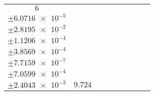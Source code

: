 \documentclass[8pt]{article}
\begin{document}
\begin{longtable}[l]{c c c c c c c c c}
$\num{6}$ & \begin{tabular}[c]{@{}c@{}}$\num{0.12366}$ \\ $\pm\num{6.0716e-5}$\end{tabular} & \begin{tabular}[c]{@{}c@{}}$\num{0.31832}$ \\ $\pm\num{2.8195e-2}$\end{tabular} & \begin{tabular}[c]{@{}c@{}}$\num{6.649}$ \\ $\pm\num{1.1206e-4}$\end{tabular} & \begin{tabular}[c]{@{}c@{}}$\num{951.35}$ \\ $\pm\num{3.8569e-4}$\end{tabular} & \begin{tabular}[c]{@{}c@{}}$\num{1.9032}$ \\ $\pm\num{7.7159e-7}$\end{tabular} & \begin{tabular}[c]{@{}c@{}}$\num{1.1863}$ \\ $\pm\num{7.0599e-4}$\end{tabular} & \begin{tabular}[c]{@{}c@{}}$\num{4.2487}$ \\ $\pm\num{2.4043e-3}$\end{tabular} & $\num{9.724}$\\
\bottomrule
\end{longtable}
\end{document}

